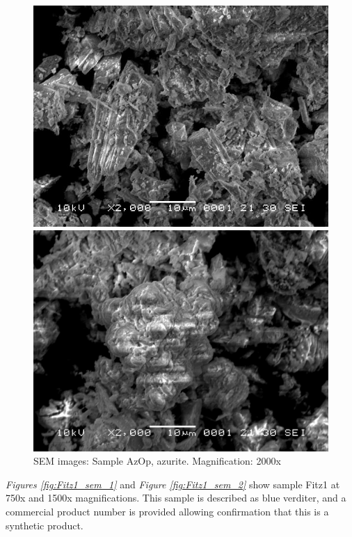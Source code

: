 \begin{figure}[H]
\centering
\begin{minipage}{.45\textwidth}
  \centering
  \includegraphics[width=\linewidth]{AzOp_x2000_1_150321}
\end{minipage}
\begin{minipage}{.45\textwidth}
  \centering
  \includegraphics[width=\linewidth]{AzOp_x2000_4_150321}
\end{minipage}
\caption[SEM images: Sample AzOp, azurite]{SEM images: Sample AzOp, azurite. Magnification: 2000x}
\label{fig:azop_sem_2}
\end{figure}

\textit{Figures \ref{fig:Fitz1_sem_1}} and \textit{Figure \ref{fig:Fitz1_sem_2}} show sample Fitz1 at 750x and 1500x magnifications. This sample is described as blue verditer, and a commercial product number is provided allowing confirmation that this is a synthetic product.

